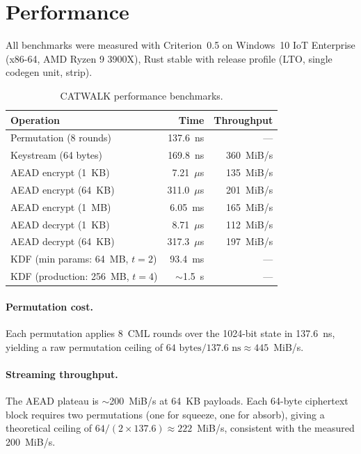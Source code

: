 \documentclass[runningheads]{llncs}
\begin{document}
\section{Performance}
\label{sec:performance}

All benchmarks were measured with Criterion~0.5 on Windows~10 IoT Enterprise
(x86-64, AMD Ryzen 9 3900X),%
\space Rust stable with release profile (LTO, single codegen unit, strip).

\begin{table}[h]
\centering
\caption{CATWALK performance benchmarks.}
\label{tab:performance}
\begin{tabular}{@{}lrr@{}}
\toprule
Operation & Time & Throughput \\
\midrule
Permutation (8 rounds) & 137.6~ns & --- \\
Keystream (64 bytes) & 169.8~ns & 360~MiB/s \\
AEAD encrypt (1~KB) & 7.21~$\mu$s & 135~MiB/s \\
AEAD encrypt (64~KB) & 311.0~$\mu$s & 201~MiB/s \\
AEAD encrypt (1~MB) & 6.05~ms & 165~MiB/s \\
AEAD decrypt (1~KB) & 8.71~$\mu$s & 112~MiB/s \\
AEAD decrypt (64~KB) & 317.3~$\mu$s & 197~MiB/s \\
KDF (min params: 64~MB, $t\!=\!2$) & 93.4~ms & --- \\
KDF (production: 256~MB, $t\!=\!4$) & $\sim$1.5~s & --- \\
\bottomrule
\end{tabular}
\end{table}

\paragraph{Permutation cost.}
Each permutation applies 8~CML rounds over the 1024-bit state in 137.6~ns,
yielding a raw permutation ceiling of $64\text{ bytes} / 137.6\text{ ns} \approx 445$~MiB/s.

\paragraph{Streaming throughput.}
The AEAD plateau is $\sim$200~MiB/s at 64~KB payloads.  Each 64-byte ciphertext
block requires two permutations (one for squeeze, one for absorb), giving a
theoretical ceiling of $64 / (2 \times 137.6) \approx 222$~MiB/s, consistent
with the measured 200~MiB/s.
\end{document}
